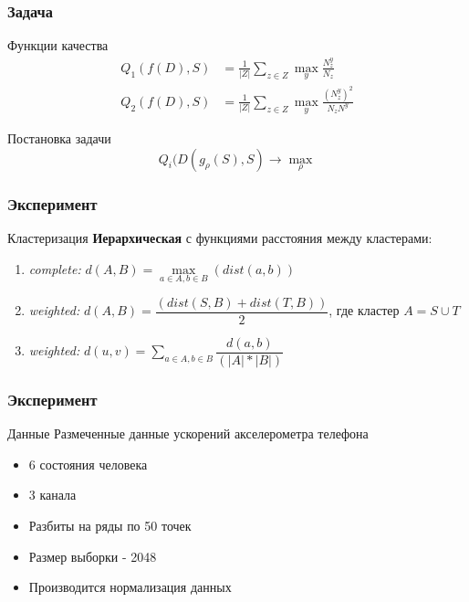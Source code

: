 \documentclass{beamer}
\begin{document}
\begin{frame}
    \frametitle{Задача}
    \begin{block}{Функции качества}
    \begin{align*}
        Q_1(f(D), S) &= \frac{1}{|Z|}\sum\limits_{z \in Z} \max_y \frac{N_z^y}{N_z}  \\
        Q_2(f(D), S) &= \frac{1}{|Z|}\sum\limits_{z \in Z} \max_y \frac{(N_z^y)^2}{N_z N^y}
    \end{align*}
    \end{block}

    \begin{block}{Постановка задачи}
        $$
            Q_i(D(g_\rho(S), S) \rightarrow \max_{\rho}
        $$
    \end{block}
\end{frame}
    

\begin{frame}
    \frametitle{Эксперимент}
    \begin{block}{Кластеризация}
        \textbf{Иерархическая} с функциями расстояния между кластерами: 
        \begin{enumerate}
            \item \textit{complete:}  $d(A, B) = \max\limits_{a \in A, b \in B}(dist(a, b))$ 
            \item \textit{weighted:}  $d(A,B) = \dfrac{(dist(S,B) + dist(T,B))}{2}$, где кластер $A = S \cup T$
            \item \textit{weighted:}  $d(u,v) = \sum\limits_{a \in A, b \in B} \dfrac{d(a, b)}{(|A|*|B|)}$ 
        \end{enumerate} 
    \end{block}
\end{frame}
 
\begin{frame}
    \frametitle{Эксперимент}   
    \begin{block}{Данные}
        Размеченные данные ускорений акселерометра телефона
        \begin{itemize}
            \item 6 состояния человека
            \item 3 канала
            \item Разбиты на ряды по 50 точек
            \item Размер выборки - 2048
            \item Производится нормализация данных
        \end{itemize}
    \end{block}
\end{frame}
    
\end{document}
